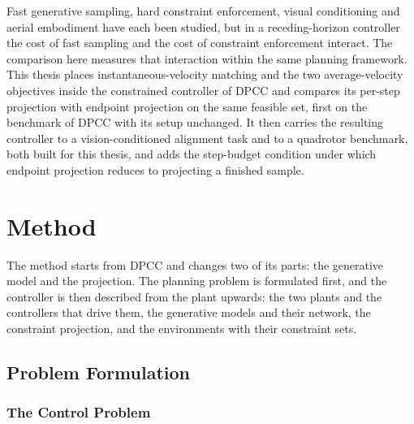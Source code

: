 \documentclass[headsepline,footsepline,footinclude=false,oneside,fontsize=11pt,paper=a4,listof=totoc,bibliography=totoc]{scrbook}
\theoremstyle{definition}
\theoremstyle{plain}
\theoremstyle{remark}
\begin{document}
Fast generative sampling, hard constraint enforcement, visual conditioning and aerial embodiment have
each been studied, but in a receding-horizon controller the cost of fast sampling and the cost of
constraint enforcement interact. The comparison here measures that interaction within the same
planning framework.
This thesis places instantaneous-velocity matching and the two average-velocity objectives inside the
constrained controller
of \ac{DPCC} and compares its per-step projection with endpoint projection \parencite{li2025hardflow}
on the same feasible set, first on the benchmark of \ac{DPCC} with its setup unchanged. It then carries
the resulting controller to a vision-conditioned alignment task and to a quadrotor benchmark, both built
for this thesis, and adds the step-budget condition under which endpoint projection reduces to
projecting a finished sample.

\chapter{Method}\label{ch:method}

The method starts from \ac{DPCC} and changes two of its parts: the generative model and the projection.
The planning problem is formulated first, and the controller is then described from the plant upwards:
the two plants and the controllers that drive them, the generative models and their network, the
constraint projection, and the environments with their constraint sets.

\section{Problem Formulation}\label{sec:method:formalisation}

\subsection{The Control Problem}
\end{document}
